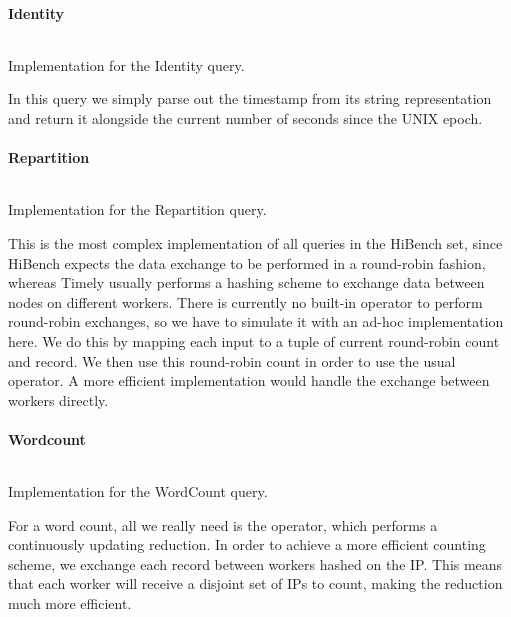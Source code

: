\paragraph{Identity}
\begin{listing}[H]
  \inputminted[firstline=96,lastline=98]{rust}{benchmarks/src/hibench.rs}
  \caption{Implementation for the Identity query.}
  \label{lst:hibench-identity}
\end{listing}

In this query we simply parse out the timestamp from its string representation and return it alongside the current number of seconds since the UNIX epoch.

\paragraph{Repartition}
\begin{listing}[H]
  \inputminted[firstline=132,lastline=142]{rust}{benchmarks/src/hibench.rs}
  \caption{Implementation for the Repartition query.}
  \label{lst:hibench-repartition}
\end{listing}

This is the most complex implementation of all queries in the HiBench set, since HiBench expects the data exchange to be performed in a round-robin fashion, whereas Timely usually performs a hashing scheme to exchange data between nodes on different workers. There is currently no built-in operator to perform round-robin exchanges, so we have to simulate it with an ad-hoc implementation here. We do this by mapping each input to a tuple of current round-robin count and record. We then use this round-robin count in order to use the usual  operator. A more efficient implementation would handle the exchange between workers directly.

\paragraph{Wordcount}
\begin{listing}[H]
  \inputminted[firstline=174,lastline=176]{rust}{benchmarks/src/hibench.rs}
  \caption{Implementation for the WordCount query.}
  \label{lst:hibench-wordcount}
\end{listing}

For a word count, all we really need is the  operator, which performs a continuously updating reduction. In order to achieve a more efficient counting scheme, we exchange each record between workers hashed on the IP. This means that each worker will receive a disjoint set of IPs to count, making the reduction much more efficient.

